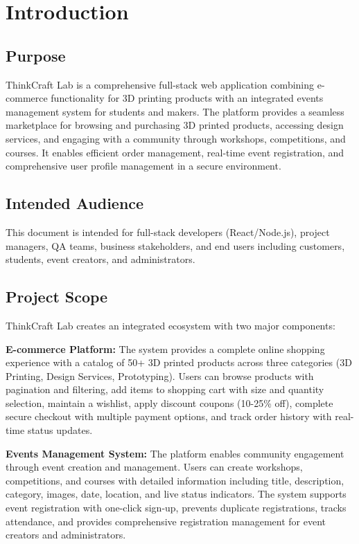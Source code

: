 ﻿\documentclass[11pt]{article}
\begin{document}
\tableofcontents
\newpage

\section{Introduction}

\subsection{Purpose}
ThinkCraft Lab is a comprehensive full-stack web application combining e-commerce functionality for 3D printing products with an integrated events management system for students and makers. The platform provides a seamless marketplace for browsing and purchasing 3D printed products, accessing design services, and engaging with a community through workshops, competitions, and courses. It enables efficient order management, real-time event registration, and comprehensive user profile management in a secure environment.

\subsection{Intended Audience}
This document is intended for full-stack developers (React/Node.js), project managers, QA teams, business stakeholders, and end users including customers, students, event creators, and administrators.

\subsection{Project Scope}
ThinkCraft Lab creates an integrated ecosystem with two major components:

\textbf{E-commerce Platform:} The system provides a complete online shopping experience with a catalog of 50+ 3D printed products across three categories (3D Printing, Design Services, Prototyping). Users can browse products with pagination and filtering, add items to shopping cart with size and quantity selection, maintain a wishlist, apply discount coupons (10-25\% off), complete secure checkout with multiple payment options, and track order history with real-time status updates.

\textbf{Events Management System:} The platform enables community engagement through event creation and management. Users can create workshops, competitions, and courses with detailed information including title, description, category, images, date, location, and live status indicators. The system supports event registration with one-click sign-up, prevents duplicate registrations, tracks attendance, and provides comprehensive registration management for event creators and administrators.
\end{document}
